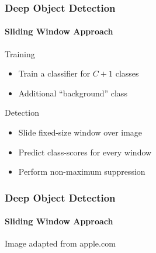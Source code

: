\documentclass[xetex,professionalfont]{beamer}
\begin{document}
\begin{frame}
	\frametitle{Deep Object Detection}
	\framesubtitle{Sliding Window Approach}

	Training
	\begin{itemize}
		\item Train a classifier for $C+1$ classes %
		\item Additional \enquote{background} class %
	\end{itemize}

	\bigskip

	Detection
	\begin{itemize}
		\item Slide fixed-size window over image
		\item Predict class-scores for every window
		\item Perform non-maximum suppression %
	\end{itemize}

\end{frame}


\begin{frame}
	\frametitle{Deep Object Detection}
	\framesubtitle{Sliding Window Approach}

	\begin{center}
		{\centering Image adapted from apple.com}
	\end{center}

\end{frame}
\end{document}
